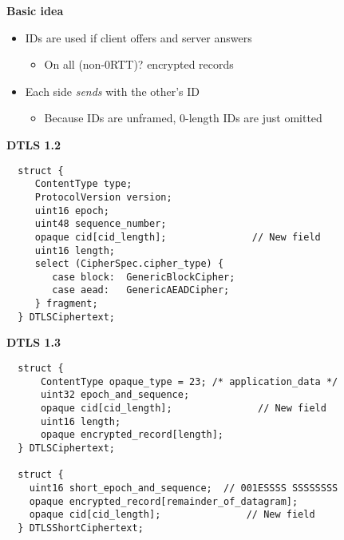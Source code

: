 \documentclass[helvetica]{seminar}
\newcommand{\heading}[1]{%
  \begin{center} 
    \large\bf 
    #1 
  \end{center} 
  \vspace{.4 in}}
\begin{document}
\begin{slide}
  \heading{Basic idea}
  
\begin{itemize}
\item IDs are used if client offers and server answers
  \begin{itemize}
    \item On all (non-0RTT)? encrypted records
  \end{itemize}
\item Each side \emph{sends} with the other's ID
  \begin{itemize}
    \item Because IDs are unframed, 0-length IDs are just omitted
  \end{itemize}
\end{itemize}
\end{slide}

\begin{slide}
  \heading{DTLS 1.2}

\begin{verbatim}
  struct {
     ContentType type;
     ProtocolVersion version;
     uint16 epoch;
     uint48 sequence_number;
     opaque cid[cid_length];               // New field
     uint16 length;
     select (CipherSpec.cipher_type) {
        case block:  GenericBlockCipher;
        case aead:   GenericAEADCipher;
     } fragment;
  } DTLSCiphertext;
\end{verbatim}
\end{slide}

\begin{slide}
  \heading{DTLS 1.3}

  \vspace{-5ex}
  \small{
\begin{verbatim}
  struct {
      ContentType opaque_type = 23; /* application_data */
      uint32 epoch_and_sequence;
      opaque cid[cid_length];               // New field
      uint16 length;
      opaque encrypted_record[length];
  } DTLSCiphertext;

  struct {
    uint16 short_epoch_and_sequence;  // 001ESSSS SSSSSSSS
    opaque encrypted_record[remainder_of_datagram];
    opaque cid[cid_length];               // New field
  } DTLSShortCiphertext;


\end{verbatim}
}
\end{slide}
\end{document}
